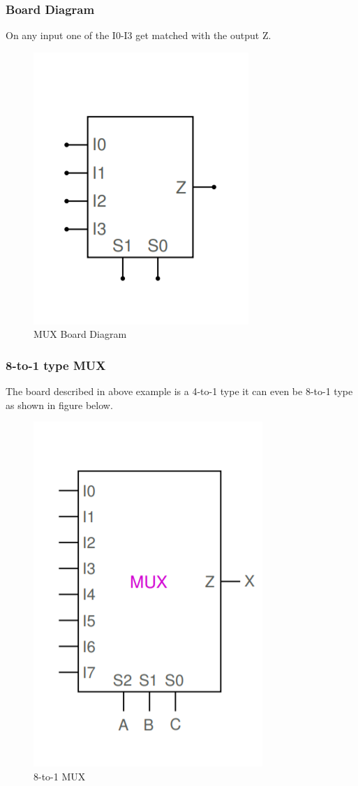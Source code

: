 \documentclass{report}
\begin{document}
\subsubsection{Board Diagram}
On any input one of the I0-I3 get matched with the output Z.
\begin{figure}[h]
    \centering
    \includegraphics[scale=0.5]{mux_board.png}
    \caption{MUX Board Diagram}
    \label{fig:my_label}
\end{figure} 
\subsubsection{8-to-1 type MUX}
The board described in above example is a 4-to-1 type it can even be 8-to-1 type as shown in figure below. 
\begin{figure}[h]
    \centering
    \includegraphics[scale=0.5]{8to1.png}
    \caption{8-to-1 MUX}
    \label{fig:my_label}
\end{figure} 
\newpage
\end{document}
